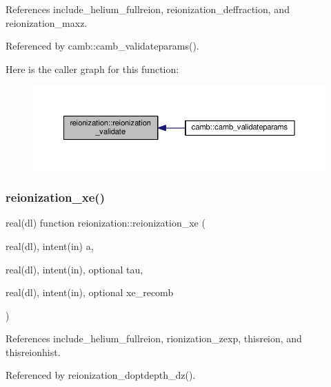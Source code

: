 References include\+\_\+helium\+\_\+fullreion, reionization\+\_\+deffraction, and reionization\+\_\+maxz.



Referenced by camb\+::camb\+\_\+validateparams().

Here is the caller graph for this function\+:
\nopagebreak
\begin{figure}[H]
\begin{center}
\leavevmode
\includegraphics[width=350pt]{namespacereionization_a3b0809c8b733201a4293d2bd47d81398_icgraph}
\end{center}
\end{figure}
\mbox{\label{namespacereionization_a2ed4204b4a8a9400f3e0b3a8f628b584}} 
\subsubsection{\texorpdfstring{reionization\+\_\+xe()}{reionization\_xe()}}
{\footnotesize\ttfamily real(dl) function reionization\+::reionization\+\_\+xe (\begin{DoxyParamCaption}\item[{real(dl), intent(in)}]{a,  }\item[{real(dl), intent(in), optional}]{tau,  }\item[{real(dl), intent(in), optional}]{xe\+\_\+recomb }\end{DoxyParamCaption})}



References include\+\_\+helium\+\_\+fullreion, rionization\+\_\+zexp, thisreion, and thisreionhist.



Referenced by reionization\+\_\+doptdepth\+\_\+dz().

